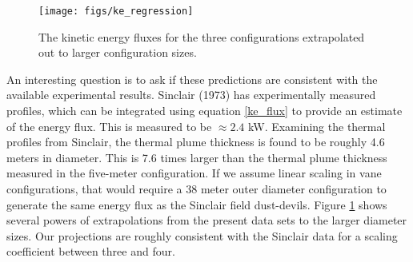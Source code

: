 \documentclass[english]{article}
\begin{document}
\begin{figure}[!htb]
  \begin{center}
    \texttt{[image: figs/ke\_regression]}
    \caption{The kinetic energy fluxes for the three configurations extrapolated out to larger configuration sizes.}
    \label{fig:ke_regression}
  \end{center}
\end{figure}

An interesting question is to ask if these predictions are consistent with the available experimental results. 
Sinclair (1973) has experimentally measured profiles, which can be integrated using equation \ref{ke_flux} to 
provide an estimate of the energy flux. This is measured to be $\approx 2.4$ kW. Examining the thermal 
profiles from Sinclair, the thermal plume thickness is found to be roughly 4.6 meters in diameter. This is 
7.6 times larger than the thermal plume thickness measured in the five-meter configuration. If we assume 
linear scaling in vane configurations, that would require a 38 meter outer diameter configuration to 
generate the same energy flux as the Sinclair field dust-devils. Figure \ref{fig:ke_regression} shows 
several powers of extrapolations from the present data sets to the larger diameter sizes. Our projections 
are roughly consistent with the Sinclair data for a scaling coefficient between three and four. 
\end{document}
